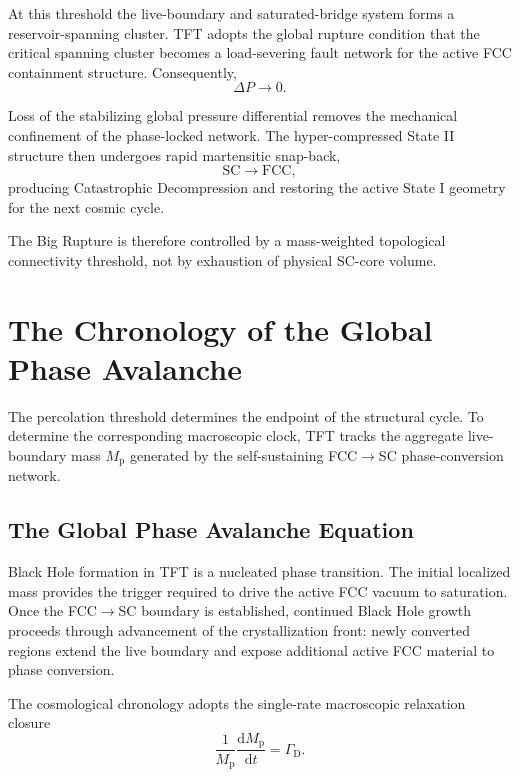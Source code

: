 At this threshold the live-boundary and saturated-bridge system forms a reservoir-spanning cluster. TFT adopts the global rupture condition that the critical spanning cluster becomes a load-severing fault network for the active FCC containment structure. Consequently,
\begin{equation}
    \Delta P
    \rightarrow
    0.
\end{equation}

Loss of the stabilizing global pressure differential removes the mechanical confinement of the phase-locked network. The hyper-compressed State II structure then undergoes rapid martensitic snap-back,
\begin{equation}
    \mathrm{SC}
    \rightarrow
    \mathrm{FCC},
\end{equation}
producing Catastrophic Decompression and restoring the active State I geometry for the next cosmic cycle.

The Big Rupture is therefore controlled by a mass-weighted topological connectivity threshold, not by exhaustion of physical SC-core volume.

\section{The Chronology of the Global Phase Avalanche}

The percolation threshold determines the endpoint of the structural cycle. To determine the corresponding macroscopic clock, TFT tracks the aggregate live-boundary mass $M_{\mathrm{p}}$ generated by the self-sustaining FCC$\rightarrow$SC phase-conversion network.

\subsection{The Global Phase Avalanche Equation}

Black Hole formation in TFT is a nucleated phase transition. The initial localized mass provides the trigger required to drive the active FCC vacuum to saturation. Once the FCC$\rightarrow$SC boundary is established, continued Black Hole growth proceeds through advancement of the crystallization front: newly converted regions extend the live boundary and expose additional active FCC material to phase conversion.

The cosmological chronology adopts the single-rate macroscopic relaxation closure
\begin{equation}
    \frac{1}{M_{\mathrm{p}}}
    \frac{\mathrm{d}M_{\mathrm{p}}}{\mathrm{d}t}
    =
    \Gamma_{\mathrm{D}}.
\end{equation}

